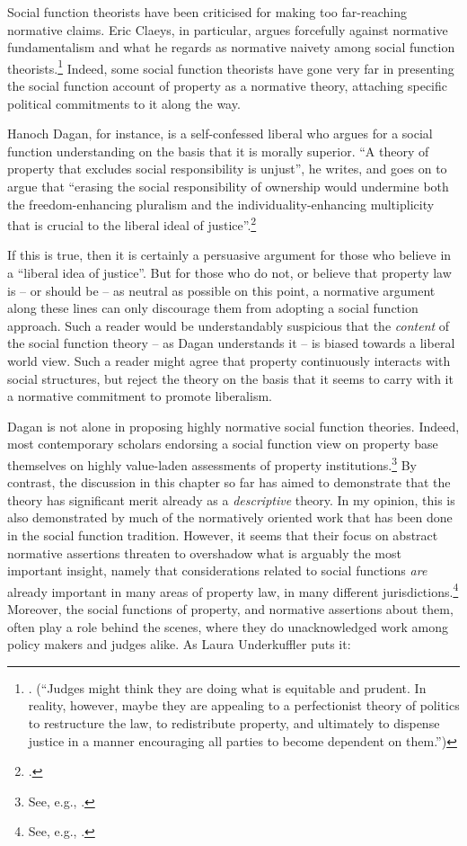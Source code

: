 Social function theorists have been criticised for making too far-reaching normative claims. Eric Claeys, in particular, argues forcefully against normative fundamentalism and what he regards as normative naivety among social function theorists.\footnote{\cite[945]{claeys09}. (``Judges might think they are doing what is equitable and prudent. In reality, however, maybe they are appealing to a perfectionist theory of politics to restructure the law, to redistribute property, and ultimately to dispense justice in a manner encouraging all parties to become dependent on them.'')} Indeed, some social function theorists have gone very far in presenting the social function account of property as a normative theory, attaching specific political commitments to it along the way.

Hanoch Dagan, for instance, is a self-confessed liberal who argues for a social function understanding on the basis that it is morally superior. ``A theory of property that excludes social responsibility is unjust'', he writes, and goes on to argue that ``erasing the social responsibility of ownership would undermine both the freedom-enhancing pluralism and the individuality-enhancing multiplicity that is crucial to the liberal ideal of justice''.\footcite[1259]{dagan07}

If this is true, then it is certainly a persuasive argument for those who believe in a ``liberal idea of justice''. But for those who do not, or believe that property law is -- or should be -- as neutral as possible on this point, a normative argument along these lines can only discourage them from adopting a social function approach. Such a reader would be understandably suspicious that the {\it content} of the social function theory -- as Dagan understands it -- is biased towards a liberal world view. Such a reader might agree that property continuously interacts with social structures, but reject the theory on the basis that it seems to carry with it a normative commitment to promote liberalism.

Dagan is not alone in proposing highly normative social function theories. Indeed, most contemporary scholars endorsing a social function view on property base themselves on highly value-laden assessments of property institutions.\footnote{See, e.g.,  \cite{alexander09,crawford11,davidson11,singer09,penalver09}.} By contrast, the discussion in this chapter so far has aimed to demonstrate that the theory has significant merit already as a {\it descriptive} theory. In my opinion, this is also demonstrated by much of the normatively oriented work that has been done in the social function tradition. However, it seems that their focus on abstract normative assertions threaten to overshadow what is arguably the most important insight, namely that considerations related to social functions {\it are} already important in many areas of property law, in many different jurisdictions.\footnote{See, e.g., \cite{gray94,mirow11,cunha11,bonilla11}.} Moreover, the social functions of property, and normative assertions about them, often play a role behind the scenes, where they do unacknowledged work among policy makers and judges alike. As Laura Underkuffler puts it:

